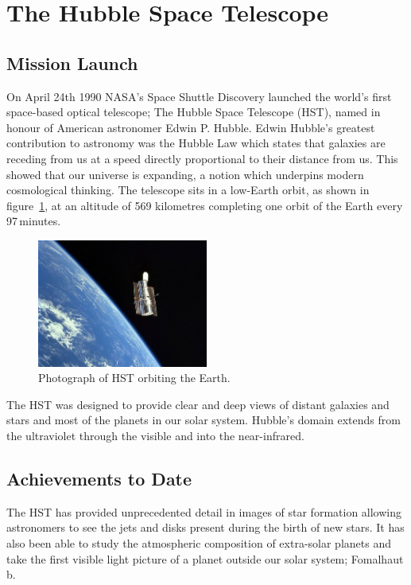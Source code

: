 
\section{The Hubble Space Telescope} %
\label{sec:the_hubble_space_telescope}

	\subsection{Mission Launch} %
	\label{ssub:mission_launch}
		On April 24th 1990 NASA’s Space Shuttle Discovery launched the world’s first space-based optical telescope; The Hubble Space Telescope (HST), named in honour of American astronomer Edwin P. Hubble. Edwin Hubble’s greatest contribution to astronomy was the Hubble Law which states that galaxies are receding from us at a speed directly proportional to their distance from us. This showed that our universe is expanding, a notion which underpins modern cosmological thinking. The telescope sits in a low-Earth orbit, as shown in figure~\ref{fig:hubble_space_telescope}, at an altitude of 569 kilometres completing one orbit of the Earth every 97\,minutes\cite{Hubsite_1}.
		\begin{figure}[ht]
			\centering
			\includegraphics[width=0.5\textwidth]{../Images/Hubble_Space_Telescope.jpg}
			\caption{Photograph of HST orbiting the Earth.\label{fig:hubble_space_telescope}}
		\end{figure}

		The HST was designed to provide clear and deep views of distant galaxies and stars and most of the planets in our solar system. Hubble's domain extends from the ultraviolet through the visible and into the near-infrared\cite{NASA_1}.

	\subsection{Achievements to Date} %
	\label{ssub:achievements_to_date}
		The HST has provided unprecedented detail in images of star formation allowing astronomers to see the jets and disks present during the birth of new stars. It has also been able to study the atmospheric composition of extra-solar planets and take the first visible light picture of a planet outside our solar system; Fomalhaut b\cite{Hubsite_3}.

